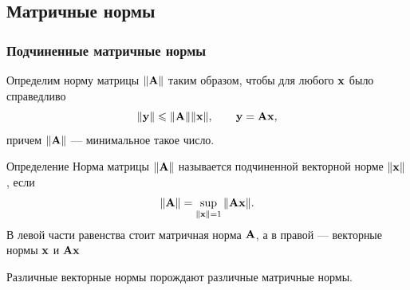 \documentclass[apectratio=43,unicode]{beamer}
\begin{document}
\subsection{Матричные нормы}
\begin{frame}
\frametitle{Подчиненные матричные нормы}
	Определим норму матрицы $\|{\mathbf{A}}\|$ таким образом, чтобы для любого ${\mathbf{x}}$ было
справедливо
	\[
		\|{\mathbf{y}}\| \leqslant \|{\mathbf{A}}\| \|{\mathbf{x}}\|, \qquad {\mathbf{y}} = {\mathbf{A}}{\mathbf{x}},
	\]
	причем $\|{\mathbf{A}}\|$ --- минимальное такое число.

	\begin{block}{Определение}
	Норма матрицы $\|{\mathbf{A}}\|$ называется подчиненной векторной норме $\|{\mathbf{x}}\|$,
если
	\[
		\|{\mathbf{A}}\| = \sup_{\|{\mathbf{x}}\| = 1} \|{\mathbf{A}}{\mathbf{x}}\|.
	\]
	В левой части равенства стоит матричная норма ${\mathbf{A}}$, а в правой ---
векторные нормы ${\mathbf{x}}$ и ${\mathbf{A}}{\mathbf{x}}$
	\end{block}
	Различные векторные нормы порождают различные матричные нормы.
\end{frame}
\end{document}
